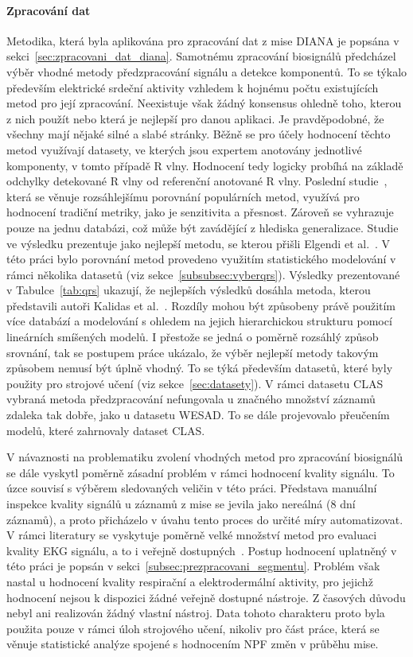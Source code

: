\paragraph{Zpracování dat}
Metodika, která byla aplikována pro zpracování dat z mise DIANA je popsána v
sekci~\ref{sec:zpracovani_dat_diana}. Samotnému zpracování biosignálů předcházel
výběr vhodné metody předzpracování signálu a detekce komponentů. To se týkalo
především elektrické srdeční aktivity vzhledem k hojnému počtu existujících
metod pro její zpracování. Neexistuje však žádný konsensus ohledně toho, kterou
z nich použít nebo která je nejlepší pro danou aplikaci. Je pravděpodobné, že
všechny mají nějaké silné a slabé stránky. Běžně se pro účely hodnocení těchto
metod využívají datasety, ve kterých jsou expertem anotovány jednotlivé
komponenty, v tomto případě R vlny. Hodnocení tedy logicky probíhá na základě
odchylky detekované R vlny od referenční anotované R vlny. Poslední
studie~\cite{Porr2019}, která se věnuje rozsáhlejšímu porovnání populárních
metod, využívá pro hodnocení tradiční metriky, jako je senzitivita a přesnost.
Zároveň se vyhrazuje pouze na jednu databázi, což může být zavádějící z hlediska
generalizace. Studie~\cite{Porr2019} ve výsledku prezentuje jako nejlepší
metodu, se kterou přišli Elgendi et al.~\cite{Elgendi2010}. V této práci bylo
porovnání metod provedeno využitím statistického modelování v rámci několika
datasetů (viz sekce~\ref{subsubsec:vyberqrs}). Výsledky prezentované v
Tabulce~\ref{tab:qrs} ukazují, že nejlepších výsledků dosáhla metoda, kterou
představili autoři Kalidas et al.~\cite{kalidas2017}. Rozdíly mohou být
způsobeny právě použitím více databází a modelování s ohledem na jejich
hierarchickou strukturu pomocí lineárních smíšených modelů. I přestože se jedná
o poměrně rozsáhlý způsob srovnání, tak se postupem práce ukázalo, že výběr
nejlepší metody takovým způsobem nemusí být úplně vhodný. To se týká především
datasetů, které byly použity pro strojové učení (viz sekce~\ref{sec:datasety}).
V rámci datasetu CLAS vybraná metoda předzpracování nefungovala u značného
množství záznamů zdaleka tak dobře, jako u datasetu WESAD. To se dále
projevovalo přeučením modelů, které zahrnovaly dataset CLAS.

V návaznosti na problematiku zvolení vhodných metod pro zpracování biosignálů se
dále vyskytl poměrně zásadní problém v rámci hodnocení kvality signálu. To úzce
souvisí s výběrem sledovaných veličin v této práci. Představa manuální inspekce
kvality signálů u záznamů z mise se jevila jako nereálná (8 dní záznamů), a
proto přicházelo v úvahu tento proces do určité míry automatizovat. V rámci
literatury se vyskytuje poměrně velké množství metod pro evaluaci kvality EKG
signálu, a to i veřejně dostupných~\cite{Bijl2022,Satija2018}. Postup hodnocení
uplatněný v této práci je popsán v sekci~\ref{subsec:prezpracovani_segmentu}.
Problém však nastal u hodnocení kvality respirační a elektrodermální aktivity,
pro jejichž hodnocení nejsou k dispozici žádné veřejně dostupné nástroje. Z
časových důvodu nebyl ani realizován žádný vlastní nástroj. Data tohoto
charakteru proto byla použita pouze v rámci úloh strojového učení, nikoliv pro
část práce, která se věnuje statistické analýze spojené s hodnocením \gls{NPF}
změn v průběhu mise.

